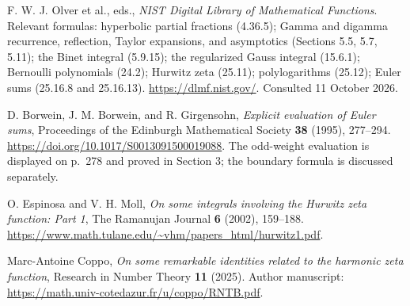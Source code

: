 F. W. J. Olver et al., eds.,
\emph{NIST Digital Library of Mathematical Functions}.
Relevant formulas: hyperbolic partial fractions (4.36.5);
Gamma and digamma recurrence, reflection, Taylor expansions,
and asymptotics (Sections 5.5, 5.7, 5.11);
the Binet integral (5.9.15); the regularized Gauss integral
(15.6.1); Bernoulli polynomials (24.2);
Hurwitz zeta (25.11); polylogarithms (25.12);
Euler sums (25.16.8 and 25.16.13).
\url{https://dlmf.nist.gov/}. Consulted 11 October 2026.

D. Borwein, J. M. Borwein, and R. Girgensohn,
\emph{Explicit evaluation of Euler sums},
Proceedings of the Edinburgh Mathematical Society \textbf{38}
(1995), 277--294.
\url{https://doi.org/10.1017/S0013091500019088}.
The odd-weight evaluation is displayed on p.~278 and proved in
Section 3; the boundary formula is discussed separately.

O. Espinosa and V. H. Moll,
\emph{On some integrals involving the Hurwitz zeta function:
Part 1}, The Ramanujan Journal \textbf{6} (2002), 159--188.
\url{https://www.math.tulane.edu/~vhm/papers_html/hurwitz1.pdf}.

Marc-Antoine Coppo,
\emph{On some remarkable identities related to the harmonic zeta
function}, Research in Number Theory \textbf{11} (2025).
Author manuscript:
\url{https://math.univ-cotedazur.fr/u/coppo/RNTB.pdf}.

